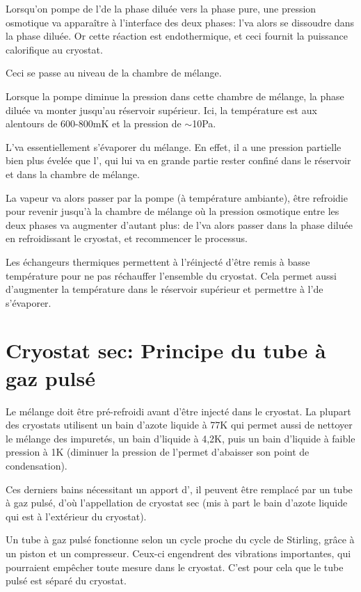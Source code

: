 Lorsqu'on pompe de l'\HeT de la phase diluée vers la phase pure, une pression osmotique va apparaître à l'interface des deux phases: l'\HeT va alors se dissoudre dans la phase diluée. Or cette réaction est endothermique, et ceci fournit la puissance calorifique au cryostat.

Ceci se passe au niveau de la chambre de mélange.

Lorsque la pompe diminue la pression dans cette chambre de mélange, la phase diluée va monter jusqu'au réservoir supérieur. Ici, la température est aux alentours de 600-800mK et la pression de $\sim$10Pa.

L'\HeT va essentiellement s'évaporer du mélange. En effet, il a une pression partielle bien plus évelée que l'\HeQ, qui lui va en grande partie rester confiné dans le réservoir et dans la chambre de mélange.
\newline

La vapeur va alors passer par la pompe (à température ambiante), être refroidie pour revenir jusqu'à la chambre de mélange où la pression osmotique entre les deux phases va augmenter d'autant plus: de l'\HeT va alors passer dans la phase diluée en refroidissant le cryostat, et recommencer le processus. \newline

Les échangeurs thermiques permettent à l'\HeT réinjecté d'être remis à basse température pour ne pas réchauffer l'ensemble du cryostat. Cela permet aussi d'augmenter la température dans le réservoir supérieur et permettre à l'\HeT de s'évaporer.

\section{Cryostat sec: Principe du tube à gaz pulsé}
Le mélange doit être pré-refroidi avant d'être injecté dans le cryostat.\newline
La plupart des cryostats utilisent un bain d'azote liquide à 77K qui permet aussi de nettoyer le mélange des impuretés, un bain d'\HeQ liquide à 4,2K, puis un bain d'\HeQ liquide à faible pression à 1K (diminuer la pression de l'\HeQ permet d'abaisser son point de condensation).

Ces derniers bains nécessitant un apport d'\HeQ, il peuvent être remplacé par un tube à gaz pulsé, d'où l'appellation de cryostat sec (mis à part le bain d'azote liquide qui est à l'extérieur du cryostat).

Un tube à gaz pulsé fonctionne selon un cycle proche du cycle de Stirling, grâce à un piston et un compresseur. Ceux-ci engendrent des vibrations importantes, qui pourraient empêcher toute mesure dans le cryostat. C'est pour cela que le tube pulsé est séparé du cryostat.

